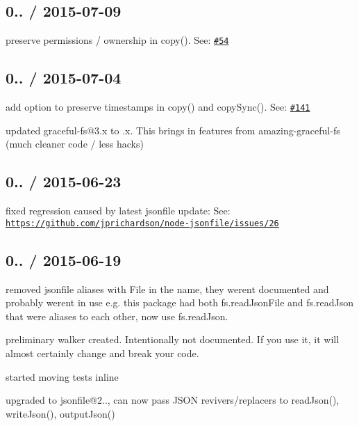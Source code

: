 \subsection*{0.. / 2015-\/07-\/09 }


\begin{DoxyItemize}
\item preserve permissions / ownership in {\ttfamily copy()}. See\+: \href{https://github.com/jprichardson/node-fs-extra/issues/54}{\tt \#54}
\end{DoxyItemize}

\subsection*{0.. / 2015-\/07-\/04 }


\begin{DoxyItemize}
\item add option to preserve timestamps in {\ttfamily copy()} and {\ttfamily copy\+Sync()}. See\+: \href{https://github.com/jprichardson/node-fs-extra/pull/141}{\tt \#141}
\item updated {\ttfamily graceful-\/fs@3.\+x} to {.\+x}. This brings in features from {\ttfamily amazing-\/graceful-\/fs} (much cleaner code / less hacks)
\end{DoxyItemize}

\subsection*{0.. / 2015-\/06-\/23 }


\begin{DoxyItemize}
\item fixed regression caused by latest jsonfile update\+: See\+: \href{https://github.com/jprichardson/node-jsonfile/issues/26}{\tt https\+://github.\+com/jprichardson/node-\/jsonfile/issues/26}
\end{DoxyItemize}

\subsection*{0.. / 2015-\/06-\/19 }


\begin{DoxyItemize}
\item removed {\ttfamily jsonfile} aliases with {\ttfamily File} in the name, they weren\textquotesingle{}t documented and probably weren\textquotesingle{}t in use e.\+g. this package had both {\ttfamily fs.\+read\+Json\+File} and {\ttfamily fs.\+read\+Json} that were aliases to each other, now use {\ttfamily fs.\+read\+Json}.
\item preliminary walker created. Intentionally not documented. If you use it, it will almost certainly change and break your code.
\item started moving tests inline
\item upgraded to {\ttfamily jsonfile@2..}, can now pass J\+S\+ON revivers/replacers to {\ttfamily read\+Json()}, {\ttfamily write\+Json()}, {\ttfamily output\+Json()}
\end{DoxyItemize}

